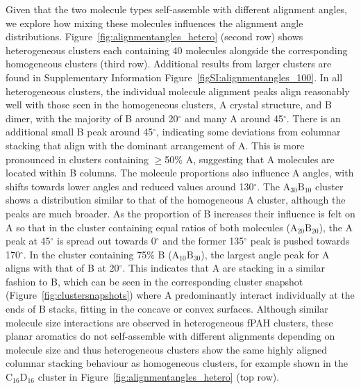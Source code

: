 Given that the two molecule types self-assemble with different alignment angles, we explore how mixing these molecules influences the alignment angle distributions. Figure~\ref{fig:alignmentangles_hetero} (second row) shows heterogeneous clusters each containing 40 molecules alongside the corresponding homogeneous clusters (third row). Additional results from larger clusters are found in Supplementary Information Figure~\ref{figSI:alignmentangles_100}. In all heterogeneous clusters, the individual molecule alignment peaks align reasonably well with those seen in the homogeneous clusters, A crystal structure, and B dimer, with the majority of B around 20$^{\circ}$ and many A around 45$^{\circ}$. There is an additional small B peak around 45$^{\circ}$, indicating some deviations from columnar stacking that align with the dominant arrangement of A. This is more pronounced in clusters containing $\geq$50\% A, suggesting that A molecules are located within B columns. The molecule proportions also influence A angles, with shifts towards lower angles and reduced values around 130$^{\circ}$. The $\text{A}_{\text{30}}\text{B}_{\text{10}}$ cluster shows a distribution similar to that of the homogeneous A cluster, although the peaks are much broader. As the proportion of B increases their influence is felt on A so that in the cluster containing equal ratios of both molecules ($\text{A}_{\text{20}}\text{B}_{\text{20}}$), the A peak at 45$^{\circ}$ is spread out towards 0$^{\circ}$ and the former 135$^{\circ}$ peak is pushed towards 170$^{\circ}$. In the cluster containing 75\% B ($\text{A}_{\text{10}}\text{B}_{\text{30}}$), the largest angle peak for A aligns with that of B at 20$^{\circ}$. This indicates that A are stacking in a similar fashion to B, which can be seen in the corresponding cluster snapshot (Figure~\ref{fig:clustersnapshots}) where A predominantly interact individually at the ends of B stacks, fitting in the concave or convex surfaces. Although similar molecule size interactions are observed in heterogeneous fPAH clusters, these planar aromatics do not self-assemble with different alignments depending on molecule size and thus heterogeneous clusters show the same highly aligned columnar stacking behaviour as homogeneous clusters, for example shown in the $\text{C}_{\text{16}}\text{D}_{\text{16}}$ cluster in Figure~\ref{fig:alignmentangles_hetero} (top row).
%
